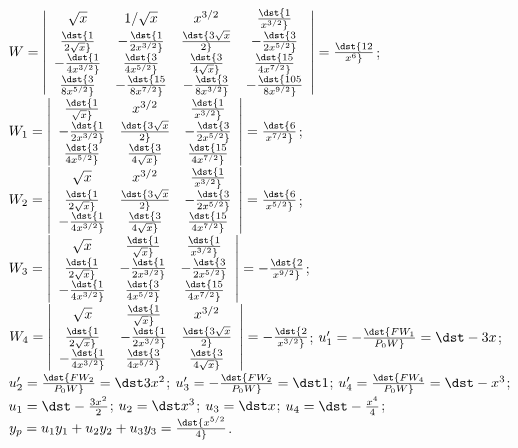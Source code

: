 \documentclass[dvips]{book}
\renewcommand{\exer}[1]{\par\medskip\;\noindent{\color{red}\bf #1.}}
\numberwithin{example}{section}
\numberwithin{equation}{section}
\numberwithin{theorem}{section}
\numberwithin{table}{section}
\numberwithin{figure}{section}
\begin{document}
\exer{9.4.14}
$W=\left|\begin{array}{cccc}
\sqrt{x}&1/\sqrt{x}&x^{3/2}&\dst{1\over x^{3/2}}
\\\dst{1\over
2\sqrt{x}}&-\dst{1\over 2x^{3/2}}&\dst{3\sqrt{x}\over
2}&-\dst{3\over 2x^{5/2}}\\
-\dst{1\over
4x^{3/2}}&\dst{3\over 4x^{5/2}}&\dst{3\over
4\sqrt{x}}&\dst{15\over 4x^{7/2}}\\
\dst{3\over
8x^{5/2}}&-\dst{15\over
8x^{7/2}}&-\dst{3\over 8x^{3/2}}&-\dst{105\over 8x^{9/2}}
\end{array}\right|=\dst{12\over x^6}$;
$W_1=
\left|\begin{array}{cccc}
\dst{1\over \sqrt{x}}&x^{3/2}&\dst{1\over x^{3/2}}\\
-\dst{1\over 2x^{3/2}}&\dst{3\sqrt{x}\over 2}&-\dst{3\over
2x^{5/2}}\\
\dst{3\over 4x^{5/2}}&\dst{3\over 4\sqrt{x}}&\dst{15\over 4x^{7/2}}
\end{array}\right|=\dst{6\over x^{7/2}}$;
$W_2=\left|\begin{array}{cccc}
\sqrt{x}&x^{3/2}&\dst{1\over x^{3/2}}\\
\dst{1\over 2\sqrt{x}}&\dst{3\sqrt{x}\over 2}&-\dst{3\over
2x^{5/2}}\\
-\dst{1\over 4x^{3/2}}&\dst{3\over 4\sqrt{x}}&\dst{15\over 4x^{7/2}}
\end{array}\right|=\dst{6\over x^{5/2}}$;
$W_3=\left|\begin{array}{cccc}
\sqrt{x}&\dst{1\over \sqrt{x}}&\dst{1\over x^{3/2}}\\
\dst{1\over 2\sqrt{x}}&-\dst{1\over 2x^{3/2}}&-\dst{3\over
2x^{5/2}}\\
-\dst{1\over 4x^{3/2}}&\dst{3\over 4x^{5/2}}&\dst{15\over 4x^{7/2}}
\end{array}\right|=-\dst{2\over x^{9/2}}$;
$W_4=\left|\begin{array}{cccc}
\sqrt{x}&\dst{1\over \sqrt{x}}&x^{3/2}\\
\dst{1\over 2\sqrt{x}}&-\dst{1\over 2x^{3/2}}&\dst{3\sqrt{x}\over 2}\\
-\dst{1\over 4x^{3/2}}&\dst{3\over 4x^{5/2}}&\dst{3\over 4\sqrt{x}}
\end{array}\right|=-\dst{2\over x^{3/2}}$;
$u_1'=-\dst{FW_1\over P_0W}=\dst-3x$;
$u_2'=\dst{FW_2\over P_0W}=\dst3x^2$;
$u_3'=-\dst{FW_2\over P_0W}=\dst1$;
$u_4'=\dst{FW_4\over P_0W}=\dst-x^3$;
$u_1=\dst-{3x^2\over 2}$;
$u_2=\dst x^3$;
$u_3=\dst x$;
$u_4=\dst-{x^4\over 4}$;
$y_p=u_1y_1+u_2y_2+u_3y_3=\dst {x^{5/2}\over 4}$.
\end{document}
